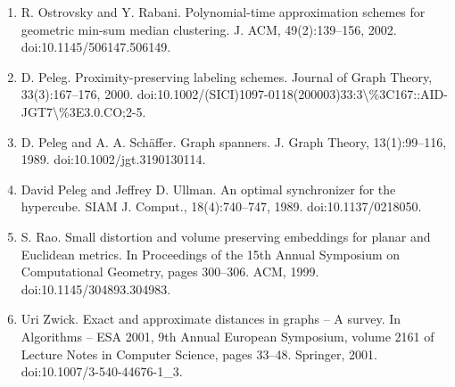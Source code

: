 \documentclass[10pt,a4paper]{amsart}
\begin{document}
\begin{enumerate}
\item  [44]  R. Ostrovsky and Y. Rabani.  Polynomial-time approximation schemes for geometric min-sum median clustering.  J. ACM, 49(2):139–156, 2002.  doi:10.1145/506147.506149.  
\item  [45]  D. Peleg.  Proximity-preserving labeling schemes.  Journal of Graph Theory, 33(3):167–176, 2000.  doi:10.1002/(SICI)1097-0118(200003)33:3\textbackslash{}\%3C167::AID-JGT7\textbackslash{}\%3E3.0.CO;2-5.  
\item  [46]  D. Peleg and A. A. Schäffer.  Graph spanners.  J. Graph Theory, 13(1):99–116, 1989.  doi:10.1002/jgt.3190130114.  
\item  [47]  David Peleg and Jeffrey D. Ullman.  An optimal synchronizer for the hypercube.  SIAM J. Comput., 18(4):740–747, 1989.  doi:10.1137/0218050.  
\item  [48]  S. Rao.  Small distortion and volume preserving embeddings for planar and Euclidean metrics.  In Proceedings of the 15th Annual Symposium on Computational Geometry, pages 300–306. ACM, 1999.  doi:10.1145/304893.304983.  
\item  [49]  Uri Zwick.  Exact and approximate distances in graphs – A survey.  In Algorithms – ESA 2001, 9th Annual European Symposium, volume 2161 of Lecture Notes in Computer Science, pages 33–48. Springer, 2001.  doi:10.1007/3-540-44676-1\_3.  
\end{enumerate}
\par
\end{document}
